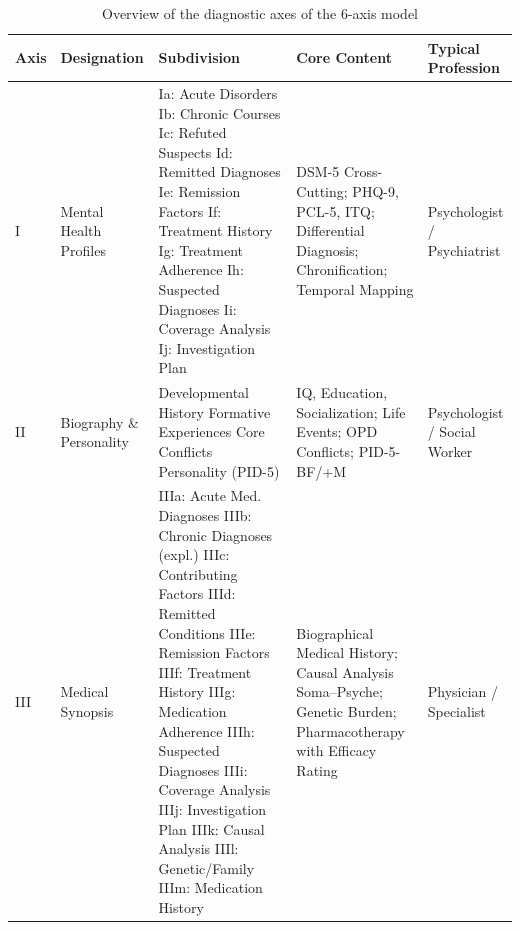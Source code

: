 \documentclass[11pt,a4paper]{article}
\begin{document}
\begin{table}[H]
\centering
\caption{Overview of the diagnostic axes of the 6-axis model}
\label{tab:achsen}
\footnotesize
\begin{tabularx}{\textwidth}{@{}L{0.8cm}L{2.1cm}L{3.3cm}Y L{2.2cm}@{}}
\toprule
\textbf{Axis} & \textbf{Designation} & \textbf{Subdivision} & \textbf{Core Content} & \textbf{Typical Profession} \\
\midrule
I & Mental Health Profiles & Ia: Acute Disorders \newline Ib: Chronic Courses \newline Ic: Refuted Suspects \newline Id: Remitted Diagnoses \newline Ie: Remission Factors \newline If: Treatment History \newline Ig: Treatment Adherence \newline Ih: Suspected Diagnoses \newline Ii: Coverage Analysis \newline Ij: Investigation Plan & DSM-5 Cross-Cutting; PHQ-9, PCL-5, ITQ; Differential Diagnosis; Chronification; Temporal Mapping & Psychologist / Psychiatrist \\
\addlinespace
II & Biography \& Personality & Developmental History \newline Formative Experiences \newline Core Conflicts \newline Personality (PID-5) & IQ, Education, Socialization; Life Events; OPD Conflicts; PID-5-BF/+M & Psychologist / Social Worker \\
\addlinespace
III & Medical Synopsis & IIIa: Acute Med. Diagnoses \newline IIIb: Chronic Diagnoses (expl.) \newline IIIc: Contributing Factors \newline IIId: Remitted Conditions \newline IIIe: Remission Factors \newline IIIf: Treatment History \newline IIIg: Medication Adherence \newline IIIh: Suspected Diagnoses \newline IIIi: Coverage Analysis \newline IIIj: Investigation Plan \newline IIIk: Causal Analysis \newline IIIl: Genetic/Family \newline IIIm: Medication History & Biographical Medical History; Causal Analysis Soma--Psyche; Genetic Burden; Pharmacotherapy with Efficacy Rating & Physician / Specialist \\

\end{tabularx}
\end{table}
\end{document}
